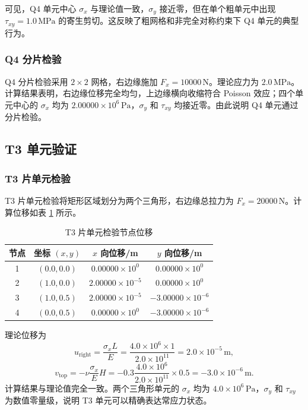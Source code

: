 \documentclass[UTF8,a4paper,zihao=-4]{ctexart}
\begin{document}
可见，Q4 单元中心 $\sigma_x$ 与理论值一致，$\sigma_y$ 接近零，但在单个粗单元中出现 $\tau_{xy}=1.0\,\mathrm{MPa}$ 的寄生剪切。这反映了粗网格和非完全对称约束下 Q4 单元的典型行为。

\subsubsection{Q4 分片检验}

Q4 分片检验采用 $2\times2$ 网格，右边缘施加 $F_x=10000\,\mathrm{N}$。理论应力为 $2.0\,\mathrm{MPa}$。计算结果表明，右边缘位移完全均匀，上边缘横向收缩符合 Poisson 效应；四个单元中心的 $\sigma_x$ 均为 $2.00000\times10^6\,\mathrm{Pa}$，$\sigma_y$ 和 $\tau_{xy}$ 均接近零。由此说明 Q4 单元通过分片检验。

\subsection{T3 单元验证}

\subsubsection{T3 片单元检验}

T3 片单元检验将矩形区域划分为两个三角形，右边缘总拉力为 $F_x=20000\,\mathrm{N}$。计算位移如表 \ref{tab:t3_patch_disp} 所示。

\begin{table}[H]
    \centering
    \caption{T3 片单元检验节点位移}
    \label{tab:t3_patch_disp}
    \begin{tabular}{cccc}
        \toprule
        节点 & 坐标 $(x,y)$ & $x$ 向位移/m & $y$ 向位移/m\\
        \midrule
        1 & $(0.0,0.0)$ & $0.00000\times10^{0}$ & $0.00000\times10^{0}$\\
        2 & $(1.0,0.0)$ & $2.00000\times10^{-5}$ & $0.00000\times10^{0}$\\
        3 & $(1.0,0.5)$ & $2.00000\times10^{-5}$ & $-3.00000\times10^{-6}$\\
        4 & $(0.0,0.5)$ & $0.00000\times10^{0}$ & $-3.00000\times10^{-6}$\\
        \bottomrule
    \end{tabular}
\end{table}

理论位移为
\[
    u_{\mathrm{right}}
    =
    \frac{\sigma_x L}{E}
    =
    \frac{4.0\times10^6\times1}{2.0\times10^{11}}
    =
    2.0\times10^{-5}\,\mathrm{m},
\]
\[
    v_{\mathrm{top}}
    =
    -\nu\frac{\sigma_x}{E}H
    =
    -0.3
    \frac{4.0\times10^6}{2.0\times10^{11}}
    \times0.5
    =
    -3.0\times10^{-6}\,\mathrm{m}.
\]
计算结果与理论值完全一致。两个三角形单元的 $\sigma_x$ 均为 $4.0\times10^6\,\mathrm{Pa}$，$\sigma_y$ 和 $\tau_{xy}$ 为数值零量级，说明 T3 单元可以精确表达常应力状态。
\end{document}
